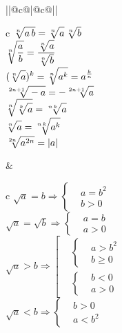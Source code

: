 
\begin{tabu}[t]{||@{}c@{}|@{}c@{}||}
	\hline	
		 \\
	\hline
		\begin{tabu}[t]{c}
				$\displaystyle \sqrt[n]{\mathstrut a\, b} = \sqrt[n]{\mathstrut a} \, \sqrt[n]{\mathstrut b} $ \\
			\hline
				$\displaystyle \sqrt[n]{\mathstrut \frac{a}{b}} = \frac{\sqrt[n]{\mathstrut a}}{\sqrt[n]{\mathstrut b}} $ \\
			\hline
				$\displaystyle (\sqrt[n]{\mathstrut a})^k = \sqrt[n]{\mathstrut a^k} = a^{\frac{k}{n}} $ \\
			\hline
				$\displaystyle \sqrt[2n + 1]{\mathstrut -a} = -\sqrt[2n + 1]{\mathstrut a} $ \\
			\hline
				$\displaystyle \sqrt[n]{\mathstrut \sqrt[k]{\mathstrut a}} = \sqrt[n\, k]{\mathstrut a} $ \\
			\hline
				$\displaystyle \sqrt[n]{\mathstrut a} = \sqrt[n\, k]{\mathstrut a^k} $ \\
			\hline
				$\displaystyle \sqrt[2n]{\mathstrut a^{2n}} = |a| $ \\
		\end{tabu} &
		\begin{tabu}[t]{c}
				$\displaystyle \sqrt{a} = b \Rightarrow  \left\{ \begin{aligned}
					& a = b^2 \\
					& b > 0
				\end{aligned}\right. $ \\
			\hline
				$\displaystyle \sqrt{a} = \sqrt{b} \Rightarrow  \left\{ \begin{aligned}
					& a = b \\
					& a > 0
				\end{aligned}\right. $ \\
			\hline
				$\displaystyle \sqrt{a} > b \Rightarrow  \left[ \begin{aligned}
					& \left\{ \begin{aligned}
						& a > b^2 \\
						& b \geqslant 0
					\end{aligned} \right. \\
					& \left\{ \begin{aligned}
						& b < 0 \\
						& a > 0
					\end{aligned} \right.
				\end{aligned} \right. $ \\
			\hline
				$\displaystyle \sqrt{a} < b \Rightarrow \left\{ \begin{aligned}
						& b > 0 \\
						& a < b^2
					\end{aligned} \right. $ \\
		\end{tabu} \\
	\hline
\end{tabu}




